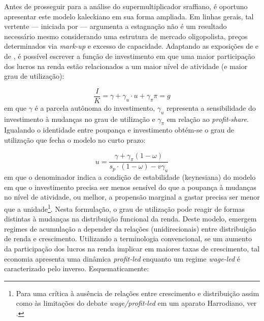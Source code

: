 Antes de prosseguir para a análise do supermultiplicador sraffiano, é oportuno apresentar este modelo kaleckiano em sua forma ampliada.
Em linhas gerais, tal vertente --- iniciada por \textcite{bhaduri_unemployment_1990} ---  argumenta a estagnação não é um resultado necessário mesmo considerando uma estrutura de mercado oligopolista, preços determinados via \textit{mark-up} e excesso de capacidade.
Adaptando as exposições de \textcite{setterfield_distribution_2002} e de \textcite[Cap, 6]{lavoie_post-keynesian_2015}, é possível escrever a função de investimento em que uma maior participação dos lucros na renda estão relacionados a um maior nível de atividade (e maior grau de utilização):

\begin{equation}
\label{PostKalecki}
\frac{I}{K} = \gamma + \gamma_u\cdot u + \gamma_{\pi}\pi = g
\end{equation}
em que $\gamma$ é a parcela autônoma do investimento, $\gamma_u$ representa a sensibilidade do investimento à mudanças no grau de utilização e $\gamma_{\pi}$ em relação ao \textit{profit-share}. Igualando o identidade entre poupança e investimento obtém-se o grau de utilização que fecha o modelo no curto prazo:

\begin{equation}
\label{KaleckiSR}
    u = \frac{\gamma + \gamma_{\pi}(1-\omega)}{s_p\cdot (1-\omega) - v\gamma_u}
\end{equation}
em que o denominador indica a condição de estabilidade (keynesiana) do modelo em que o investimento precisa ser menos sensível do que a poupança à mudanças no nível de atividade, ou melhor, a propensão marginal a gastar precisa ser menor que a unidade\footnote{Para uma crítica à ausência de relações entre crescimento e distribuição assim como às limitações do debate \textit{wage/profit-led} em um aparato
Harrodiano, 
ver 
\textcite{skott_weaknesses_2017}.}.
Nesta formulação, o grau de utilização pode reagir de formas distintas à mudanças na distribuição funcional da renda. Deste modelo, emergem regimes de acumulação a depender da relações (unidirecionais) entre distribuição de renda e crescimento. Utilizando a terminologia convencional, se um aumento da participação dos lucros na renda implicar em maiores taxas de crescimento, tal economia apresenta uma dinâmica \textit{profit-led} enquanto um regime \textit{wage-led} é caracterizado pelo inverso. Esquematicamente:

